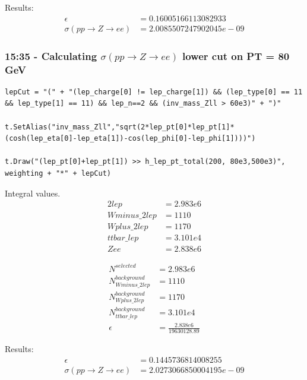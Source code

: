Results:
\begin{align}
    \epsilon &= 0.16005166113082933
    \\
    \sigma (pp \rightarrow Z \rightarrow ee) &= 2.0085507247902045e-09
\end{align}


\subsubsection*{15:35 - Calculating $\sigma(pp \rightarrow Z \rightarrow ee)$ lower cut on PT = 80 GeV}


\begin{lstlisting}
lepCut = "(" + "(lep_charge[0] != lep_charge[1]) && (lep_type[0] == 11 && lep_type[1] == 11) && lep_n==2 && (inv_mass_Zll > 60e3)" + ")"

t.SetAlias("inv_mass_Zll","sqrt(2*lep_pt[0]*lep_pt[1]*(cosh(lep_eta[0]-lep_eta[1])-cos(lep_phi[0]-lep_phi[1])))")

t.Draw("(lep_pt[0]+lep_pt[1]) >> h_lep_pt_total(200, 80e3,500e3)", weighting + "*" + lepCut)
\end{lstlisting}

Integral values. 
\begin{align}
    2lep &= 2.983e6
    \\
    Wminus\_2lep &= 1110
    \\
    Wplus\_2lep &= 1170
    \\
    ttbar\_lep &= 3.101e4
    \\
    Zee &= 2.838e6
\end{align}


\begin{align}
    N^{selected} &= 2.983e6
    \\
    N^{background}_{Wminus\_2lep} &= 1110
    \\
    N^{background}_{Wplus\_2lep} &= 1170
    \\
    N^{background}_{ttbar\_lep} &= 3.101e4
    \\
    \epsilon &= \frac{2.838e6}{19630128.89}
\end{align}

Results:
\begin{align}
    \epsilon &= 0.1445736814008255
    \\
    \sigma (pp \rightarrow Z \rightarrow ee) &= 2.0273066850004195e-09
\end{align}

